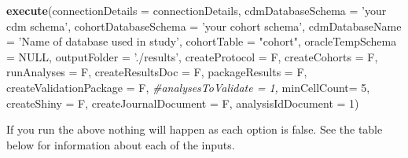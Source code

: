 \documentclass[
]{article}
\newenvironment{Shaded}{\begin{snugshade}}{\end{snugshade}}
\newcommand{\CommentTok}[1]{\textcolor[rgb]{0.56,0.35,0.01}{\textit{#1}}}
\newcommand{\DataTypeTok}[1]{\textcolor[rgb]{0.13,0.29,0.53}{#1}}
\newcommand{\DecValTok}[1]{\textcolor[rgb]{0.00,0.00,0.81}{#1}}
\newcommand{\KeywordTok}[1]{\textcolor[rgb]{0.13,0.29,0.53}{\textbf{#1}}}
\newcommand{\NormalTok}[1]{#1}
\newcommand{\OtherTok}[1]{\textcolor[rgb]{0.56,0.35,0.01}{#1}}
\newcommand{\StringTok}[1]{\textcolor[rgb]{0.31,0.60,0.02}{#1}}
\begin{document}
\begin{Shaded}
\begin{Highlighting}[]
\KeywordTok{execute}\NormalTok{(}\DataTypeTok{connectionDetails =}\NormalTok{ connectionDetails,}
        \DataTypeTok{cdmDatabaseSchema =} \StringTok{'your cdm schema'}\NormalTok{,}
        \DataTypeTok{cohortDatabaseSchema =} \StringTok{'your cohort schema'}\NormalTok{,}
        \DataTypeTok{cdmDatabaseName =} \StringTok{'Name of database used in study'}\NormalTok{,}
        \DataTypeTok{cohortTable =} \StringTok{"cohort"}\NormalTok{,}
        \DataTypeTok{oracleTempSchema =} \OtherTok{NULL}\NormalTok{,}
        \DataTypeTok{outputFolder =} \StringTok{'./results'}\NormalTok{,}
        \DataTypeTok{createProtocol =}\NormalTok{ F,}
        \DataTypeTok{createCohorts =}\NormalTok{ F,}
        \DataTypeTok{runAnalyses =}\NormalTok{ F,}
        \DataTypeTok{createResultsDoc =}\NormalTok{ F,}
        \DataTypeTok{packageResults =}\NormalTok{ F,}
        \DataTypeTok{createValidationPackage =}\NormalTok{ F,  }
        \CommentTok{#analysesToValidate = 1,}
        \DataTypeTok{minCellCount=} \DecValTok{5}\NormalTok{,}
        \DataTypeTok{createShiny =}\NormalTok{ F,}
        \DataTypeTok{createJournalDocument =}\NormalTok{ F,}
        \DataTypeTok{analysisIdDocument =} \DecValTok{1}\NormalTok{)}
\end{Highlighting}
\end{Shaded}

If you run the above nothing will happen as each option is false. See
the table below for information about each of the inputs.
\end{document}
